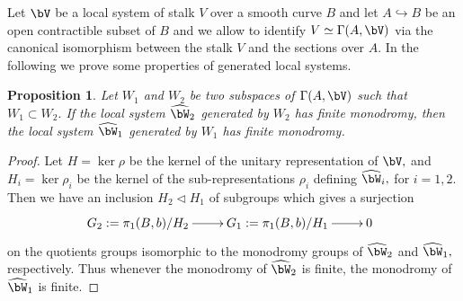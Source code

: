 \documentclass[a4paper,11pt]{amsart}
\newtheorem{proposition}[theorem]{Proposition}
\begin{document}
{				Let $\bV$ be a local system of stalk $V$ over a smooth curve $B$ and let $A\hookrightarrow B$ be an open contractible subset of $B$ and we allow to identify $V\simeq \Gamma(A,\bV)$ via the canonical isomorphism between the stalk $V$ and the sections over $A.$ In the following we prove some properties of generated local systems. 
				\begin{proposition}\label{Prop-SubLocSystMon} Let $W_1$ and $W_2$ be two subspaces of $ \Gamma(A, \bV)$ such that $W_1\subset W_2.$ If the local system $\widehat{\bW}_2$ generated by $W_2$ has finite monodromy, then the local system $\widehat{\bW}_1$ generated by $W_1$ has finite monodromy.
				\end{proposition}
				\begin{proof}
					Let $H=\ker\rho$ be the kernel of the unitary representation of $\bV,$ and $H_i=\ker \rho_i$ be the kernel of the sub-representations $\rho_i$ defining $\widehat{\bW}_i,$ for $i=1,2$. Then we have an inclusion $ H_2 \vartriangleleft H_1$  of subgroups which gives a surjection 
					\begin{equation}
					\xymatrix@!R{
						{G_2:=\pi_1(B,b)/H_2}  & {G_1:=\pi_1(B,b)/H_1}  & {0} 
						\ar"1,1";"1,2"\ar"1,2";"1,3"
						\hole
					}
					\end{equation}
					on the quotients groups isomorphic to the monodromy groups of $\widehat{\bW}_2$ and $\widehat{\bW}_1,$ respectively. Thus whenever the monodromy of $\widehat{\bW}_2$ is finite, the monodromy of $\widehat{\bW}_1$ is finite.
				\end{proof}
				
}
\end{document}
